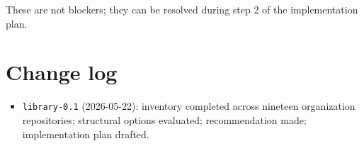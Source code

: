 \documentclass[11pt]{article}
\begin{document}
These are not blockers; they can be resolved during step 2 of the
implementation plan.

\section*{Change log}

\begin{itemize}
\item \texttt{library-0.1} (2026-05-22): inventory completed
across nineteen organization repositories; structural options
evaluated; recommendation made; implementation plan drafted.
\end{itemize}
\end{document}
